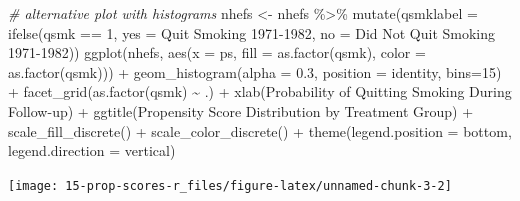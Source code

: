 \documentclass[
  10pt,
]{book}
\newenvironment{Shaded}{\begin{snugshade}}{\end{snugshade}}
\newcommand{\AttributeTok}[1]{\textcolor[rgb]{0.77,0.63,0.00}{#1}}
\newcommand{\CommentTok}[1]{\textcolor[rgb]{0.56,0.35,0.01}{\textit{#1}}}
\newcommand{\DecValTok}[1]{\textcolor[rgb]{0.00,0.00,0.81}{#1}}
\newcommand{\FloatTok}[1]{\textcolor[rgb]{0.00,0.00,0.81}{#1}}
\newcommand{\FunctionTok}[1]{\textcolor[rgb]{0.00,0.00,0.00}{#1}}
\newcommand{\NormalTok}[1]{#1}
\newcommand{\OtherTok}[1]{\textcolor[rgb]{0.56,0.35,0.01}{#1}}
\newcommand{\SpecialCharTok}[1]{\textcolor[rgb]{0.00,0.00,0.00}{#1}}
\newcommand{\StringTok}[1]{\textcolor[rgb]{0.31,0.60,0.02}{#1}}
\begin{document}
\begin{Shaded}
\begin{Highlighting}[]
\CommentTok{\# alternative plot with histograms}
\NormalTok{nhefs }\OtherTok{\textless{}{-}}\NormalTok{ nhefs }\SpecialCharTok{\%\textgreater{}\%} \FunctionTok{mutate}\NormalTok{(}\AttributeTok{qsmklabel =} \FunctionTok{ifelse}\NormalTok{(qsmk }\SpecialCharTok{==} \DecValTok{1}\NormalTok{,}
                       \AttributeTok{yes =} \StringTok{\textquotesingle{}Quit Smoking 1971{-}1982\textquotesingle{}}\NormalTok{,}
                       \AttributeTok{no =} \StringTok{\textquotesingle{}Did Not Quit Smoking 1971{-}1982\textquotesingle{}}\NormalTok{))}
\FunctionTok{ggplot}\NormalTok{(nhefs, }\FunctionTok{aes}\NormalTok{(}\AttributeTok{x =}\NormalTok{ ps, }\AttributeTok{fill =} \FunctionTok{as.factor}\NormalTok{(qsmk), }\AttributeTok{color =} \FunctionTok{as.factor}\NormalTok{(qsmk))) }\SpecialCharTok{+}
  \FunctionTok{geom\_histogram}\NormalTok{(}\AttributeTok{alpha =} \FloatTok{0.3}\NormalTok{, }\AttributeTok{position =} \StringTok{\textquotesingle{}identity\textquotesingle{}}\NormalTok{, }\AttributeTok{bins=}\DecValTok{15}\NormalTok{) }\SpecialCharTok{+}
  \FunctionTok{facet\_grid}\NormalTok{(}\FunctionTok{as.factor}\NormalTok{(qsmk) }\SpecialCharTok{\textasciitilde{}}\NormalTok{ .) }\SpecialCharTok{+}
  \FunctionTok{xlab}\NormalTok{(}\StringTok{\textquotesingle{}Probability of Quitting Smoking During Follow{-}up\textquotesingle{}}\NormalTok{) }\SpecialCharTok{+}
  \FunctionTok{ggtitle}\NormalTok{(}\StringTok{\textquotesingle{}Propensity Score Distribution by Treatment Group\textquotesingle{}}\NormalTok{) }\SpecialCharTok{+}
  \FunctionTok{scale\_fill\_discrete}\NormalTok{(}\StringTok{\textquotesingle{}\textquotesingle{}}\NormalTok{) }\SpecialCharTok{+}
  \FunctionTok{scale\_color\_discrete}\NormalTok{(}\StringTok{\textquotesingle{}\textquotesingle{}}\NormalTok{) }\SpecialCharTok{+}
  \FunctionTok{theme}\NormalTok{(}\AttributeTok{legend.position =} \StringTok{\textquotesingle{}bottom\textquotesingle{}}\NormalTok{, }\AttributeTok{legend.direction =} \StringTok{\textquotesingle{}vertical\textquotesingle{}}\NormalTok{)}
\end{Highlighting}
\end{Shaded}

\begin{center}\texttt{[image: 15-prop-scores-r\_files/figure-latex/unnamed-chunk-3-2]} \end{center}
\end{document}
